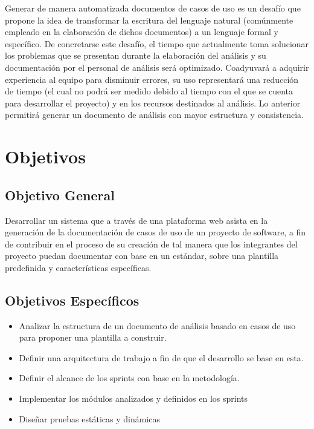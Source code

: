 Generar de manera automatizada documentos de casos de uso es un desafío que propone la idea de transformar la escritura del lenguaje natural (comúnmente empleado en la elaboración de dichos documentos) a un lenguaje formal y específico. De concretarse este desafío, el tiempo que actualmente toma solucionar los problemas que se presentan durante la elaboración del análisis y su documentación por el  personal de análisis será optimizado. Coadyuvará a adquirir experiencia al equipo para  disminuir errores, su uso representará una reducción de tiempo (el cual no podrá ser medido debido al tiempo con el que se cuenta para desarrollar el proyecto)  y en los recursos destinados al análisis. Lo anterior permitirá generar un documento de análisis  con mayor estructura y consistencia.
	
\section{Objetivos}
\subsection{Objetivo General}
Desarrollar un sistema que a través de una plataforma web asista en la generación de la documentación de casos de uso de un proyecto de software, a fin de contribuir en el proceso de su creación de tal manera que los integrantes del proyecto puedan documentar con base en un estándar, sobre una plantilla predefinida y características específicas.

\subsection{Objetivos Específicos}

\begin{itemize}
	\item Analizar la estructura de un documento de análisis basado en casos de uso para proponer una plantilla a construir.
	\item Definir una arquitectura de trabajo a fin de que el desarrollo se base en esta.
	\item Definir el alcance de los sprints con base en la metodología.
	\item Implementar los módulos analizados y definidos en los sprints
	\item Diseñar pruebas estáticas y dinámicas
\end{itemize}

